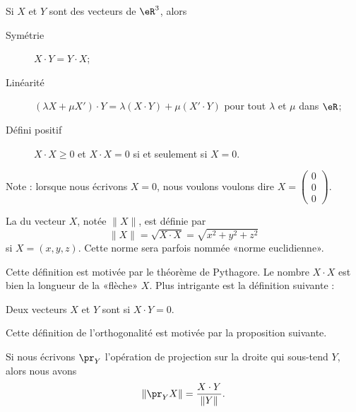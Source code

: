 \begin{proposition}
	Si $X$ et $Y$ sont des vecteurs de $\eR^3$, alors
	\begin{description}
		\item[Symétrie] $X\cdot Y=Y\cdot X$;
		\item[Linéarité] $(\lambda X+\mu X')\cdot Y=\lambda(X\cdot Y)+\mu(X'\cdot Y)$ pour tout $\lambda$ et $\mu$ dans $\eR$;
		\item[Défini positif] $X\cdot X\geq 0$ et $X\cdot X=0$ si et seulement si $X=0$.
	\end{description}
\end{proposition}
Note : lorsque nous écrivons $X=0$, nous voulons voulons dire $X=\begin{pmatrix}
	0	\\
	0	\\
	0
\end{pmatrix}$.


\begin{definition}
	La  du vecteur $X$, notée $\| X \|$, est définie par
	\begin{equation}
		\| X \|=\sqrt{X\cdot X}=\sqrt{x^2+y^2+z^2}
	\end{equation}
	si $X=(x,y,z)$. Cette norme sera parfois nommée «norme euclidienne».
\end{definition}
Cette définition est motivée par le théorème de Pythagore. Le nombre $X\cdot X$ est bien la longueur de la «flèche» $X$. Plus intrigante est la définition suivante :
\begin{definition}
	Deux vecteurs $X$ et $Y$ sont  si $X\cdot Y=0$.
\end{definition}
Cette définition de l'orthogonalité est motivée par la proposition suivante.

\begin{proposition}		\label{PropProjScal}
	Si nous écrivons $\pr_Y$  l'opération de projection sur la droite qui sous-tend $Y$, alors nous avons
	\begin{equation}
		\| \pr_YX \|=\frac{ X\cdot Y }{ \| Y \| }.
	\end{equation}
\end{proposition}

